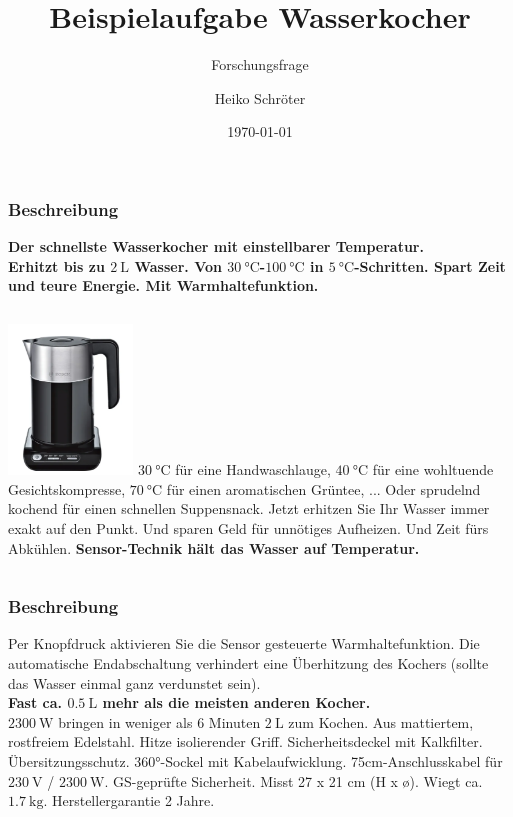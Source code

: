 \documentclass{beamer}
\title{Beispielaufgabe Wasserkocher}
\subtitle{Forschungsfrage}
\author{Heiko Schröter}
\date{\today}
\begin{document}
\frame{\titlepage}


\frame
{
  \frametitle{Beschreibung}
\textbf{{\large Der schnellste Wasserkocher mit einstellbarer Temperatur.}}\\
\textbf{Erhitzt bis zu $\SI{2}{\liter} $ Wasser. Von $\SI{30}{\degreeCelsius}$-$\SI{100}{\degreeCelsius}$ in $\SI{5}{\degreeCelsius}$-Schritten. Spart Zeit und teure Energie. Mit Warmhaltefunktion.}\\
\begin{columns}[T]
\column{3cm}
\includegraphics[height=4cm]{WK.png}
\column[t]{7cm}
$\SI{30}{\degreeCelsius}$ für eine Handwaschlauge, $\SI{40}{\degreeCelsius}$ für eine wohltuende Gesichtskompresse, $\SI{70}{\degreeCelsius}$ für einen aromatischen Grüntee, ... Oder sprudelnd kochend für einen schnellen Suppensnack. Jetzt erhitzen Sie Ihr Wasser immer exakt auf den Punkt. Und sparen Geld für unnötiges Aufheizen. Und Zeit fürs Abkühlen. \textbf{Sensor-Technik hält das Wasser auf Temperatur.}\\
\end{columns}
}
\frame
{
\frametitle{Beschreibung}
Per Knopfdruck aktivieren Sie die Sensor gesteuerte Warmhaltefunktion. Die automatische Endabschaltung verhindert eine Überhitzung des Kochers (sollte das Wasser einmal ganz verdunstet sein).\\
\textbf{Fast ca. $\SI{0.5}{\liter}$ mehr als die meisten anderen Kocher. }\\
$\SI{2300}{\watt}$ bringen in weniger als 6 Minuten $\SI{2}{\liter} $ zum Kochen. Aus mattiertem, rostfreiem Edelstahl. Hitze isolierender Griff. Sicherheitsdeckel mit Kalkfilter. Übersitzungsschutz. 360°-Sockel mit Kabelaufwicklung. 75cm-Anschlusskabel für $\SI{230}{\volt}$ / $\SI{2300}{\watt}$. GS-geprüfte Sicherheit. Misst 27 x 21 cm (H x \o). Wiegt ca. $\SI{1.7}{\kilogram}$. Herstellergarantie 2 Jahre.
}
\end{document}
